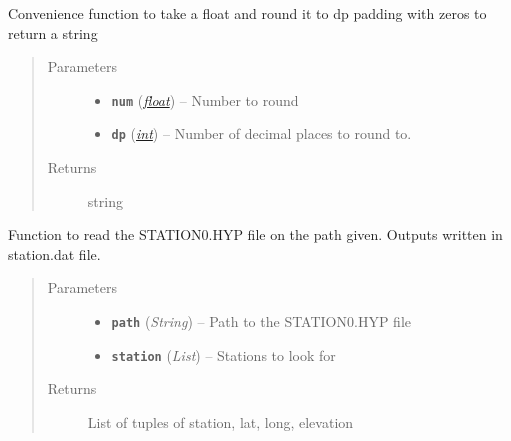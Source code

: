 \documentclass[a4paper,10pt,english]{sphinxmanual}
\begin{document}
\begin{fulllineitems}
\label{utils:catalogue2DD._cc_round}
Convenience function to take a float and round it to dp padding with zeros
to return a string
\begin{quote}\begin{description}
\item[{Parameters}] \leavevmode\begin{itemize}
\item {} 
\textbf{\texttt{num}} (\href{https://docs.python.org/library/functions.html\#float}{\emph{float}}) -- Number to round

\item {} 
\textbf{\texttt{dp}} (\href{https://docs.python.org/library/functions.html\#int}{\emph{int}}) -- Number of decimal places to round to.

\end{itemize}

\item[{Returns}] \leavevmode
string

\end{description}\end{quote}

\end{fulllineitems}


\begin{fulllineitems}
\label{utils:catalogue2DD.readSTATION0}
Function to read the STATION0.HYP file on the path given.  Outputs written
in station.dat file.
\begin{quote}\begin{description}
\item[{Parameters}] \leavevmode\begin{itemize}
\item {} 
\textbf{\texttt{path}} (\emph{String}) -- Path to the STATION0.HYP file

\item {} 
\textbf{\texttt{station}} (\emph{List}) -- Stations to look for

\end{itemize}

\item[{Returns}] \leavevmode
List of tuples of station, lat, long, elevation

\end{description}\end{quote}

\end{fulllineitems}
\end{document}
